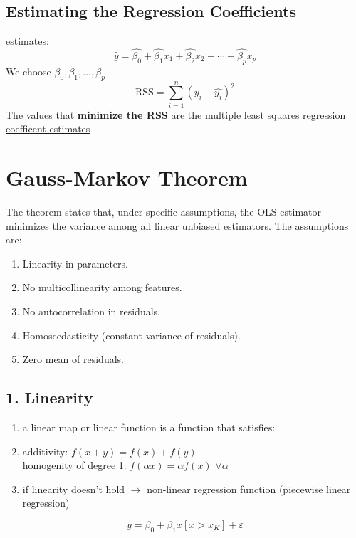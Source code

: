 \documentclass{article}
\begin{document}
\subsection*{Estimating the Regression Coefficients} 
estimates:
\begin{equation*} \hat{y} = \hat{\beta_0} + \hat{\beta_1} x_1 + \hat{\beta_2} x_2 + \cdots + \hat{\beta_p} x_p \end{equation*}
We choose $\beta_0, \beta_1, \dots, \beta_p$ 
\begin{equation*} \text{RSS} = \sum_{i=1}^{n} {(y_i - \hat{y_i})}^2 \end{equation*}
The values that \textbf{minimize the RSS} are the \underline{multiple least squares regression coefficent estimates}



\section*{Gauss-Markov Theorem}
The theorem states that, under specific assumptions, the OLS estimator minimizes the variance among all linear unbiased estimators. The assumptions are:
\begin{enumerate}
    \item Linearity in parameters.
    \item No multicollinearity among features.
    \item No autocorrelation in residuals.
    \item Homoscedasticity (constant variance of residuals).
    \item Zero mean of residuals.
\end{enumerate}

\subsection*{1. Linearity}
\begin{enumerate}
    \item a linear map or linear function is a function that satisfies: 
    \item additivity: $f(x+y) = f(x) + f(y)$ \\  homogenity of degree 1: $f(\alpha x) = \alpha f(x)$ $\forall \alpha$ 
    \item if linearity doesn't hold $\rightarrow$ non-linear regression function (piecewise linear regression)
\end{enumerate}

\begin{equation} y = \beta_0 + \beta_1 x [x > x_K] + \varepsilon \end{equation}
\end{document}
